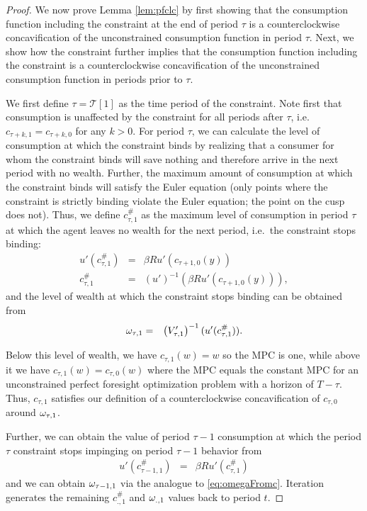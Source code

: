 	
	\begin{proof}
	We now prove Lemma \ref{lem:pfclc} by first showing that the consumption function including the constraint at the end of period $\tau$ is a counterclockwise concavification of the unconstrained consumption function in period $\tau$. Next, we show how the constraint further implies that the consumption function including the constraint is a counterclockwise concavification of the unconstrained consumption function in periods prior to $\tau$.
	
	We first define $\tau = \mathcal{T}[1]$ as the time period of the constraint. Note first that consumption is unaffected by the constraint for all periods after $\tau$, i.e. $c_{\tau+k,1}=c_{\tau+k,0}$ for any $k > 0$. For period $\tau$, we can calculate the level of consumption at which the constraint binds by realizing that a consumer for whom the constraint binds will save nothing and therefore arrive in the next period with no wealth. Further, the maximum amount of consumption at which the constraint binds will satisfy the Euler equation (only points where the constraint is strictly binding violate the Euler equation; the point on the cusp does not). Thus, we define $c_{\tau,1}^{\#}$ as the maximum level of consumption in period $\tau$ at which the agent leaves no wealth for the next period, i.e.\ the constraint stops binding:
	\begin{eqnarray*}
		\label{eq:ctau1}
		u'(c_{\tau,1}^{\#})   & = & \beta R u'(c_{\tau+1,0}({y}))
		\\   c_{\tau,1}^{\#}       & = & (u')^{-1}\left(\beta R u'(c_{\tau+1,0}({y}))\right),
	\end{eqnarray*}
	and the level of wealth at which the constraint stops binding can be obtained from
	\begin{eqnarray}
	\label{eq:omegaFromc}
	\omega_{\tau,1} & = & \left(V'_{\tau,1}\right)^{-1}(u'(c_{\tau,1}^{\#}))  .
	\end{eqnarray}
	
	Below this level of wealth, we have $c_{\tau,1}(w) = w$ so the MPC is one, while above it we have $c_{\tau,1}(w) = c_{\tau,0}(w)$ where the MPC equals the constant MPC for an unconstrained perfect foresight optimization problem with a horizon of $T-\tau$. Thus, $c_{\tau,1}$ satisfies our definition of a counterclockwise concavification of $c_{\tau,0}$ around $\omega_{\tau,1}$.
	
	Further, we can obtain the value of period $\tau-1$ consumption at which the period $\tau$ constraint stops impinging on period $\tau-1$ behavior from
	\begin{eqnarray*}
		u'(c_{\tau-1,1}^{\#})   & = & \beta R u'(c_{\tau,1}^{\#}) \label{eq:ctaum1}
	\end{eqnarray*}
	and we can obtain $\omega_{\tau-1,1}$ via the analogue to \eqref{eq:omegaFromc}. Iteration generates the remaining $c_{.,1}^{\#}$ and $\omega_{.,1}$ values back to period $t$.
	

\end{proof}
